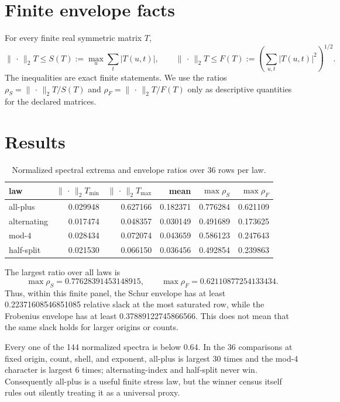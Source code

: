 \documentclass[10pt]{article}
\newcommand{\opnorm}{\lVert\,\cdot\,\rVert_2}
\begin{document}
\section{Finite envelope facts}

For every finite real symmetric matrix $T$,
\begin{equation}
 \opnorm{T}\leq S(T):=\max_u\sum_t|T(u,t)|,
 \qquad
 \opnorm{T}\leq F(T):=\left(\sum_{u,t}|T(u,t)|^2\right)^{1/2}.
 \label{eq:envelope}
\end{equation}
The inequalities are exact finite statements.  We use the ratios
$\rho_S=\opnorm{T}/S(T)$ and $\rho_F=\opnorm{T}/F(T)$ only as descriptive
quantities for the declared matrices.

\section{Results}

\begin{table}[t]
\centering
\caption{Normalized spectral extrema and envelope ratios over 36 rows per law.}
\small
\begin{tabular}{lrrrrr}
\toprule
law & $\opnorm{T}_{\min}$ & $\opnorm{T}_{\max}$ & mean & $\max\rho_S$ & $\max\rho_F$\\
\midrule
all-plus & 0.029948 & 0.627166 & 0.182371 & 0.776284 & 0.621109\\
alternating & 0.017474 & 0.048357 & 0.030149 & 0.491689 & 0.173625\\
mod-$4$ & 0.028434 & 0.072074 & 0.043659 & 0.586123 & 0.247643\\
half-split & 0.021530 & 0.066150 & 0.036456 & 0.492854 & 0.239863\\
\bottomrule
\end{tabular}
\end{table}

The largest ratio over all laws is
\begin{equation}
 \max\rho_S=0.77628391453148915,
 \qquad
 \max\rho_F=0.62110877254133434.
 \label{eq:ratios}
\end{equation}
Thus, within this finite panel, the Schur envelope has at least
0.22371608546851085 relative slack at the most saturated row, while the
Frobenius envelope has at least 0.37889122745866566.  This does not mean that
the same slack holds for larger origins or counts.

Every one of the 144 normalized spectra is below 0.64.  In the 36 comparisons
at fixed origin, count, shell, and exponent, all-plus is largest 30 times and
the mod-4 character is largest 6 times; alternating-index and half-split never
win.  Consequently all-plus is a useful finite stress law, but the winner
census itself rules out silently treating it as a universal proxy.
\end{document}
